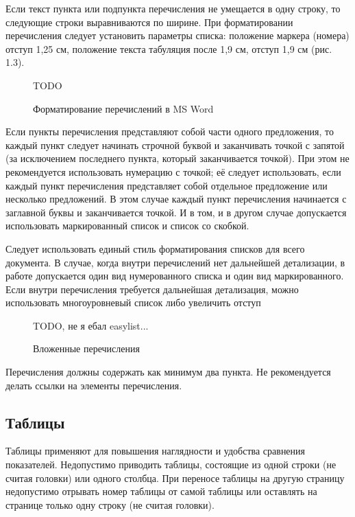Если текст пункта или подпункта перечисления не умещается в одну строку, то
следующие строки выравниваются по ширине. При форматировании перечисления следует
установить параметры списка: положение маркера (номера) отступ 1,25 см, положение текста
табуляция после 1,9 см, отступ 1,9 см (рис. 1.3).

\begin{figure}[h]
	\begin{framed}
		\centerline{TODO}
	\end{framed}
	\caption{Форматирование перечислений в MS Word}
	\label{subsects}
\end{figure}

Если пункты перечисления представляют собой части одного предложения, то каждый
пункт следует начинать строчной буквой и заканчивать точкой с запятой (за исключением
последнего пункта, который заканчивается точкой). При этом не рекомендуется использовать
нумерацию с точкой; её следует использовать, если каждый пункт перечисления представляет
собой отдельное предложение или несколько предложений. В этом случае каждый пункт
перечисления начинается с заглавной буквы и заканчивается точкой. И в том, и в другом случае
допускается использовать маркированный список и список со скобкой.

Следует использовать единый стиль форматирования списков для всего документа. В
случае, когда внутри перечислений нет дальнейшей детализации, в работе допускается один вид
нумерованного списка и один вид маркированного. Если внутри перечисления требуется
дальнейшая детализация, можно использовать многоуровневый список либо увеличить отступ

\begin{figure}[h]
	\begin{framed}
		\centerline{TODO, не я ебал easylist...}
	\end{framed}
	\caption{Вложенные перечисления}
	\label{subsects}
\end{figure}

Перечисления должны содержать как минимум два пункта. Не рекомендуется делать
ссылки на элементы перечисления.

\subsection{Таблицы}
Таблицы применяют для повышения наглядности и удобства сравнения показателей.
Недопустимо приводить таблицы, состоящие из одной строки (не считая головки) или
одного столбца. При переносе таблицы на другую страницу недопустимо отрывать номер
таблицы от самой таблицы или оставлять на странице только одну строку (не считая головки).

